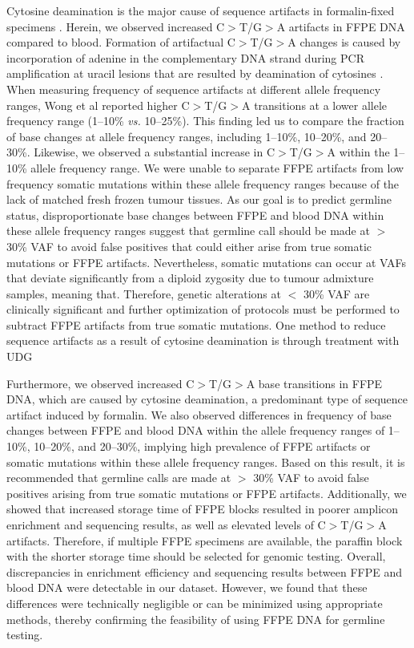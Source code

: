 Cytosine deamination is the major cause of sequence artifacts in formalin-fixed specimens \cite{Wong2014, Do2012, Oh2015, Spencer2013, Do2013, Kim2017, Chen2014}. Herein, we observed increased C$>$T/G$>$A artifacts in FFPE DNA compared to blood. Formation of artifactual C$>$T/G$>$A changes is caused by incorporation of adenine in the complementary DNA strand during PCR amplification at uracil lesions that are resulted by deamination of cytosines \cite{Do2015a}. When measuring frequency of sequence artifacts at different allele frequency ranges, Wong et al \cite{Wong2014} reported higher C$>$T/G$>$A transitions at a lower allele frequency range (1--10\% \textit{vs.} 10--25\%). This finding led us to compare the fraction of base changes at allele frequency ranges, including 1--10\%, 10--20\%, and 20--30\%. Likewise, we observed a substantial increase in C$>$T/G$>$A within the 1--10\% allele frequency range. We were unable to separate FFPE artifacts from low frequency somatic mutations within these allele frequency ranges because of the lack of matched fresh frozen tumour tissues. As our goal is to predict germline status, disproportionate base changes between FFPE and blood DNA within these allele frequency ranges suggest that germline call should be made at $>$ 30\% VAF to avoid false positives that could either arise from true somatic mutations or FFPE artifacts. Nevertheless, somatic mutations can occur at VAFs that deviate significantly from a diploid zygosity due to tumour admixture samples, meaning that. Therefore, genetic alterations at $<$ 30\% VAF are clinically significant and further optimization of protocols must be performed to subtract FFPE artifacts from true somatic mutations. One method to reduce sequence artifacts as a result of cytosine deamination is through treatment with UDG

Furthermore, we observed increased C$>$T/G$>$A base transitions in FFPE DNA, which are caused by cytosine deamination, a predominant type of sequence artifact induced by formalin. We also observed differences in frequency of base changes between FFPE and blood DNA within the allele frequency ranges of 1--10\%, 10--20\%, and 20--30\%, implying high prevalence of FFPE artifacts or somatic mutations within these allele frequency ranges. Based on this result, it is recommended that germline calls are made at $>$ 30\% VAF to avoid false positives arising from true somatic mutations or FFPE artifacts. Additionally, we showed that increased storage time of FFPE blocks resulted in poorer amplicon enrichment and sequencing results, as well as elevated levels of C$>$T/G$>$A artifacts. Therefore, if multiple FFPE specimens are available, the paraffin block with the shorter storage time should be selected for genomic testing. Overall, discrepancies in enrichment efficiency and sequencing results between FFPE and blood DNA were detectable in our dataset. However, we found that these differences were technically negligible or can be minimized using appropriate methods, thereby confirming the feasibility of using FFPE DNA for germline testing.

